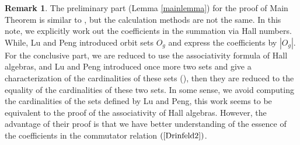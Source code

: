 \documentclass[reqno,12pt]{amsart}
\numberwithin{equation}{section}
\def\Ext{\mbox{\rm Ext}\,} \def\Hom{\mbox{\rm Hom}} \def\dim{\mbox{\rm dim}\,} \def\Iso{\mbox{\rm Iso}\,}
\def\A{{\mathcal A}}\def\P{{\mathscr{P}}}
\theoremstyle{plain} %
\theoremstyle{definition} %
\newtheorem{remark}[theorem]{\bf Remark}
\begin{document}
\begin{remark}
The preliminary part (Lemma \ref{mainlemma}) for the proof of Main Theorem is similar to \cite[Lemma 4.9]{LP}, but the calculation methods are not the same. In this note, we explicitly work out the coefficients in the summation via Hall numbers. While, Lu and Peng introduced orbit sets $O_g$ and express the coefficients by $|O_g|$. For the conclusive part, we are reduced to use the associativity formula of Hall algebras, and Lu and Peng introduced once more two sets and give a characterization of the cardinalities of these sets (\cite[Lemma 4.10]{LP}), then they are reduced to the equality of the cardinalities of these two sets. In some sense, we avoid computing the cardinalities of the sets defined by Lu and Peng, this work seems to be equivalent to the proof of the associativity of Hall algebras. However, the advantage of their proof is that we have better understanding of the essence of the coefficients in the commutator relation $(\ref{Drinfeld2})$.
\end{remark}


%
%
%
%
%
\end{document}
